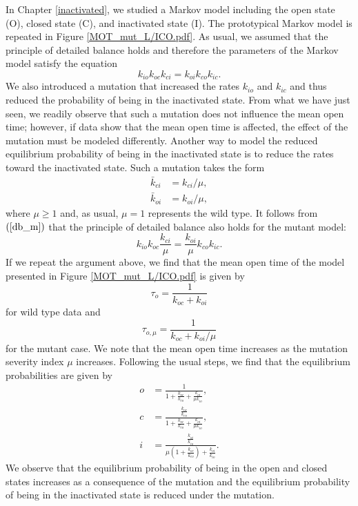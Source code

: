 In Chapter \ref{inactivated}, we studied a Markov model including the
open state (O), closed state (C), and inactivated state (I). The prototypical 
Markov model is repeated in Figure \ref{MOT_mut_L/ICO.pdf}.
 As usual, we assumed that the principle of detailed balance holds and
therefore the parameters of the Markov model satisfy the equation%
\begin{equation}
k_{io}k_{oc}k_{ci}=k_{oi}k_{co}k_{ic}.\label{db_m}%
\end{equation}
We also introduced a mutation that increased the rates $k_{io}$ and $k_{ic}$ and thus
reduced the probability of being in the inactivated state. From what we have
just seen, we readily observe that such a mutation does not influence the mean
open time; however, if data show that the mean open time is affected, the effect of
the mutation must be modeled differently. Another way to model the reduced
equilibrium probability of being in the inactivated state is to reduce the
rates toward the inactivated state. Such a mutation takes the form%
\begin{align}
\bar{k}_{ci} &  =k_{ci}/\mu,\label{ratesvm_m}\\
\bar{k}_{oi} &  =k_{oi}/\mu, \nonumber
\end{align}
where $\mu\geqslant1$ and, as usual, $\mu=1$ represents the wild type. It
follows from $\left(  \ref{db_m}\right)  $ that the principle of detailed
balance also holds for the mutant model:%
\begin{equation}
k_{io}k_{oc}\frac{k_{ci}}{\mu}=\frac{k_{oi}}{\mu}k_{co}k_{ic}.\label{db_mm}%
\end{equation}
If we repeat the argument above, we find that the mean open time of the model
presented in Figure \ref{MOT_mut_L/ICO.pdf} is given by%
\[
\tau_{o}=\frac{1}{k_{oc}+k_{oi}}%
\]
for wild type data and
\[
\tau_{o,\mu}=\frac{1}{k_{oc}+k_{oi}/\mu}%
\]
for the mutant case. We note that the mean open time increases as the mutation severity
index $\mu$ increases. Following the usual steps, we find that the equilibrium
probabilities are given by
\begin{align*}
o &  =\frac{1}{1+\frac{k_{oc}}{k_{co}}+\frac{k_{oi}}{\mu k_{io}}},\\
c &  =\frac{\frac{k_{oc}}{k_{co}}}{1+\frac{k_{oc}}{k_{co}}+\frac{k_{oi}}{\mu
k_{io}}},\\
i &  =\frac{\frac{k_{oi}}{k_{io}}}{\mu\left(  1+\frac{k_{oc}}{k_{co}}\right)
+\frac{k_{oi}}{k_{io}}}.
\end{align*}
We observe that the equilibrium probability of being in the open and closed states
increases as a consequence of the mutation and the equilibrium probability of
being in the inactivated state is reduced under the mutation.

